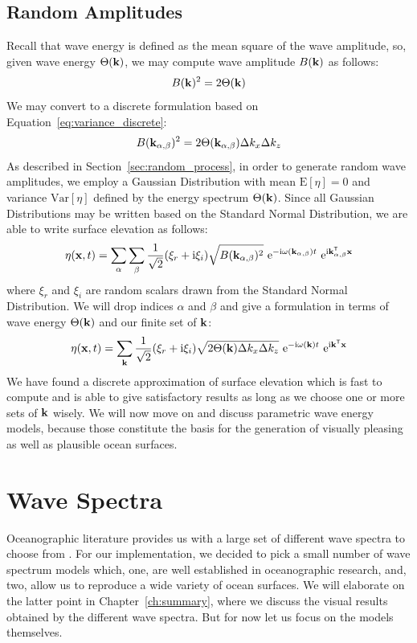 \subsection{Random Amplitudes}
\label{sec:random_amplitudes}
Recall that wave energy is defined as the mean square of the wave amplitude, so,
given wave energy $\Theta(\mathbf{k})$, we may compute wave amplitude 
$B(\mathbf{k})$ as follows:
\begin{equation*}
 B(\mathbf{k})^2 = 2\Theta(\mathbf{k})
\end{equation*}
We may convert to a discrete formulation based on 
Equation~\ref{eq:variance_discrete}:
\begin{equation*}
 B(\mathbf{k}_{\alpha,\beta})^2 = 2\Theta(\mathbf{k}_{\alpha,\beta})\Delta k_x 
\Delta k_z
\end{equation*}
As described in Section~\ref{sec:random_process}, in order to generate random 
wave amplitudes, we employ a Gaussian Distribution with mean $\mathrm{E}[\eta] 
= 0$ and variance $\mathrm{Var}[\eta]$ defined by the energy spectrum
$\Theta(\mathbf{k})$. Since all Gaussian Distributions may be written based on 
the Standard Normal Distribution, we are able to write surface elevation as 
follows:
\begin{equation*}
 \eta(\mathbf{x}, t) = 
\sum_{\alpha}\sum_{\beta}\frac{1}{\sqrt{2}}(\xi_r+\mathrm{i}\xi_i)\sqrt{B(\mathbf{
k}_{\alpha,\beta})^2}~\mathrm{e}^{-\mathrm{i}\omega(\mathbf{k}_{\alpha,\beta}) 
t}~\mathrm{e}^{\mathrm{i}\mathbf{k}_{\alpha,\beta}^{\mathsf{T}}\mathbf{x}}
\end{equation*}
where $\xi_r$ and $\xi_i$ are random scalars drawn from the Standard Normal Distribution.
We will drop indices $\alpha$ and $\beta$ and give 
a formulation in terms of wave energy $\Theta(\mathbf{k})$ and our finite set of 
\wavevectors $\mathbf{k}$:
\begin{equation}
\label{eq:surface_elevation_discrete}
 \eta(\mathbf{x}, t) = 
\sum_{\mathbf{k}}\frac{1}{\sqrt{2}}(\xi_r+\mathrm{i}\xi_i)
\sqrt{2\Theta(\mathbf{k})\Delta k_x \Delta k_z} 
~\mathrm{e}^{-\mathrm{i}\omega(\mathbf{k})t}
~\mathrm{e}^{\mathrm{i}\mathbf{k}^{\mathsf{T}}\mathbf{x}}
\end{equation}
%
We have found a discrete approximation of surface elevation which is fast to 
compute and is able to give satisfactory results as long as we choose one or 
more sets of \wavevectors $\mathbf{k}$ wisely. We will now move on and discuss
parametric wave energy models, because those constitute the basis for the
generation of visually pleasing as well as plausible ocean surfaces.
%
\section{Wave Spectra}
\label{sec:wave_spectra}
Oceanographic literature provides us with a large set of different wave spectra
to choose from \citep{Komen:1996}. For our implementation, we decided to pick a
small number of wave spectrum models which, one, are well established in
oceanographic research, and, two, allow us to reproduce a wide variety of ocean
surfaces. We will elaborate on the latter point in Chapter~\ref{ch:summary},
where we discuss the visual results obtained by the different wave spectra.
But for now let us focus on the models themselves.

